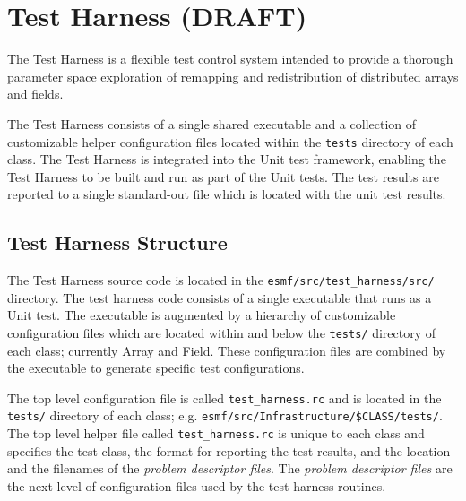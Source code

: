 \section{Test Harness (DRAFT)}
\label{sec:harness}


The Test Harness is a flexible test control system intended to provide a thorough parameter space exploration of remapping and redistribution of distributed arrays and fields.

The Test Harness consists of a single shared executable and a collection of customizable helper configuration files located within the \texttt{tests} directory of each class. The Test Harness is integrated into the Unit test framework, enabling the Test Harness to be built and run as part of the Unit tests. The test results are reported to a single standard-out file which is located with the unit test results.

\subsection{Test Harness Structure}
The Test Harness source code is  located in the \texttt{esmf/src/test\_harness/src/} directory. The test harness code consists of a single executable that runs as a Unit test. The executable is augmented by a hierarchy  of customizable configuration files which are located within and below the \texttt{tests/} directory of each class; currently Array and Field. These configuration files are combined by the executable to generate specific test configurations. 

The top level configuration file is called \texttt{test\_harness.rc} and is located in the \texttt{tests/} directory of each class; e.g. \texttt{esmf/src/Infrastructure/\$CLASS/tests/}. The top level helper file called \texttt{test\_harness.rc} is unique to each class and specifies the test class, the format for reporting the test results, and the location and the filenames of the \textit{problem descriptor files}. The \textit{problem descriptor files} are the next level of configuration files used by the test harness routines.

